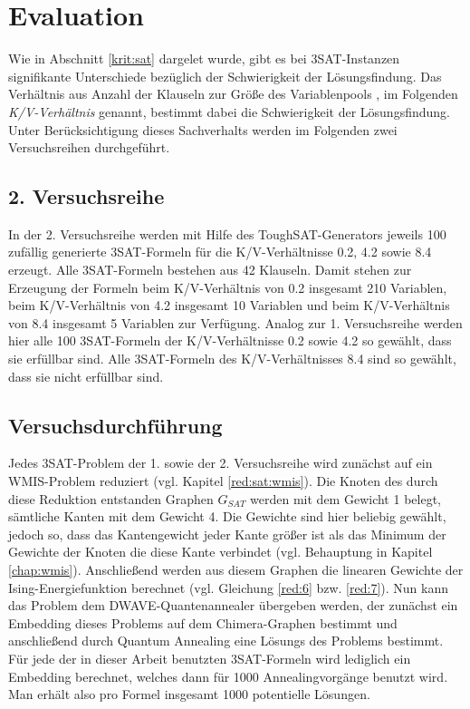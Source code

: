 
\section{Evaluation}

Wie in Abschnitt \ref{krit:sat} dargelet wurde, gibt es bei 3SAT-Instanzen signifikante Unterschiede bezüglich der Schwierigkeit der Lösungsfindung. Das Verhältnis aus Anzahl der Klauseln zur Größe des Variablenpools , im Folgenden \emph{K/V-Verhältnis} genannt, bestimmt dabei die Schwierigkeit der Lösungsfindung. Unter Berücksichtigung dieses Sachverhalts werden im Folgenden zwei Versuchsreihen durchgeführt.
\subsection{2. Versuchsreihe}
In der 2. Versuchsreihe werden mit Hilfe des ToughSAT-Generators jeweils 100 zufällig generierte 3SAT-Formeln für die K/V-Verhältnisse 0.2, 4.2 sowie 8.4 erzeugt. Alle 3SAT-Formeln bestehen aus 42 Klauseln. Damit stehen zur Erzeugung der Formeln beim  K/V-Verhältnis von 0.2 insgesamt 210 Variablen, beim K/V-Verhältnis von 4.2 insgesamt 10 Variablen und beim K/V-Verhältnis von 8.4 insgesamt 5 Variablen zur Verfügung. Analog zur 1. Versuchsreihe werden hier alle 100 3SAT-Formeln der K/V-Verhältnisse 0.2 sowie 4.2 so gewählt, dass sie erfüllbar sind. Alle 3SAT-Formeln des K/V-Verhältnisses 8.4 sind so gewählt, dass sie nicht erfüllbar sind.
\subsection{Versuchsdurchführung}
Jedes 3SAT-Problem der 1. sowie der 2. Versuchsreihe wird zunächst auf ein WMIS-Problem reduziert (vgl. Kapitel \ref{red:sat:wmis}). Die Knoten des durch diese Reduktion entstanden Graphen \emph{$G_{SAT}$} werden mit dem  Gewicht 1 belegt, sämtliche Kanten mit dem Gewicht 4. Die Gewichte sind hier beliebig gewählt, jedoch so, dass das Kantengewicht jeder Kante größer ist als das Minimum der Gewichte der Knoten die diese Kante verbindet (vgl. Behauptung in Kapitel \ref{chap:wmis}). Anschließend werden aus diesem Graphen die linearen Gewichte der Ising-Energiefunktion berechnet (vgl. Gleichung \ref{red:6} bzw. \ref{red:7}). Nun kann das Problem dem DWAVE-Quantenannealer übergeben werden, der zunächst ein Embedding dieses Problems auf dem Chimera-Graphen bestimmt und anschließend durch Quantum Annealing eine Lösungs des Problems bestimmt. Für jede der in dieser Arbeit benutzten 3SAT-Formeln wird lediglich ein Embedding berechnet, welches dann für 1000 Annealingvorgänge benutzt wird. Man erhält also pro Formel insgesamt 1000 potentielle Lösungen.

